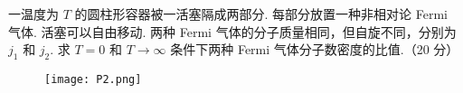 \documentclass{assignment}
\begin{document}
\begin{sol}
\begin{itemize}
    \end{itemize}
\end{sol}
\clearpage

\begin{prob}
    一温度为 $T$ 的圆柱形容器被一活塞隔成两部分. 每部分放置一种非相对论 Fermi 气体. 活塞可以自由移动. 两种 Fermi 气体的分子质量相同，但自旋不同，分别为 $j_1$ 和 $j_2$. 求 $T=0$ 和 $T\rightarrow\infty$ 条件下两种 Fermi 气体分子数密度的比值.（20 分）
    \begin{figure}[h]
        \centering
        \texttt{[image: P2.png]}
    \end{figure}
\end{prob}
\begin{sol}
    
\end{sol}
\clearpage
\end{document}
